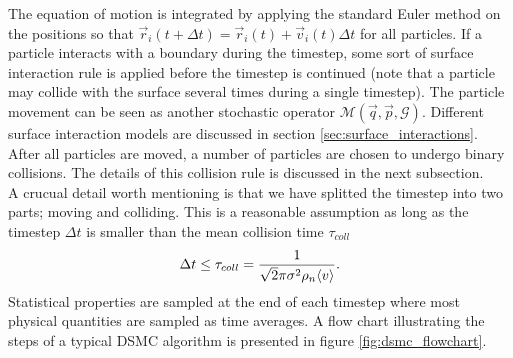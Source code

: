 The equation of motion is integrated by applying the standard Euler method on the positions so that $\vec r_i(t+\Delta t) = \vec r_i(t) + \vec v_i(t)\Delta t$ for all particles. If a particle interacts with a boundary during the timestep, some sort of surface interaction rule is applied before the timestep is continued (note that a particle may collide with the surface several times during a single timestep). The particle movement can be seen as another stochastic operator $\mathcal{M}(\vec q, \vec p, \mathcal{G})$. Different surface interaction models are discussed in section \ref{sec:surface_interactions}. After all particles are moved, a number of particles are chosen to undergo binary collisions. The details of this collision rule is discussed in the next subsection.\\
A crucual detail worth mentioning is that we have splitted the timestep into two parts; moving and colliding. This is a reasonable assumption as long as the timestep $\Delta t$ is smaller than the mean collision time $\tau_{coll}$
\begin{align}
	\Delta t \leq \tau_{coll} = {1\over \sqrt 2 \pi \sigma^2 \rho_n \langle v \rangle}.
\end{align}
Statistical properties are sampled at the end of each timestep where most physical quantities are sampled as time averages. A flow chart illustrating the steps of a typical DSMC algorithm is presented in figure \ref{fig:dsmc_flowchart}.
